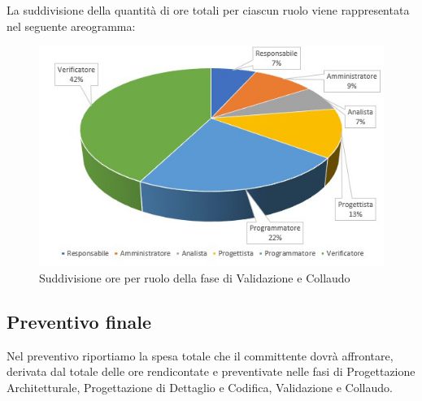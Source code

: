 La suddivisione della quantità di ore totali per ciascun ruolo viene rappresentata nel seguente areogramma:

\begin{figure}[h]
	\centering
	
	\includegraphics[scale=2.6	]{Sezioni/Aerogrammi/AerogrammaValidazione.png}
	\caption{Suddivisione ore per ruolo della fase di Validazione e Collaudo}
\end{figure}


\clearpage
\subsection{Preventivo finale} 
Nel preventivo riportiamo la spesa totale che il committente dovrà affrontare, derivata dal totale delle ore rendicontate e preventivate nelle fasi di Progettazione Architetturale, Progettazione di Dettaglio e Codifica, Validazione e Collaudo.

